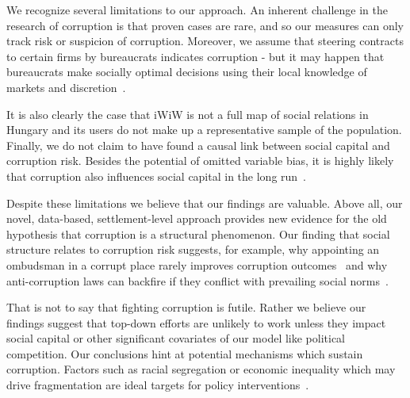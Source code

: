 We recognize several limitations to our approach. An inherent challenge in the research of corruption is that proven cases are rare, and so our measures can only track risk or suspicion of corruption. Moreover, we assume that steering contracts to certain firms by bureaucrats indicates corruption - but it may happen that bureaucrats make socially optimal decisions using their local knowledge of markets and discretion~\cite{coviello2017effect}.

It is also clearly the case that iWiW is not a full map of social relations in Hungary and its users do not make up a representative sample of the population. Finally, we do not claim to have found a causal link between social capital and corruption risk. Besides the potential of omitted variable bias, it is highly likely that corruption also influences social capital in the long run~\cite{richey2010impact}.

Despite these limitations we believe that our findings are valuable. Above all, our novel, data-based, settlement-level approach provides new evidence for the old hypothesis that corruption is a structural phenomenon. Our finding that social structure relates to corruption risk suggests, for example, why appointing an ombudsman in a corrupt place rarely improves corruption outcomes~\cite{mungiu2013controlling} and why anti-corruption laws can backfire if they conflict with prevailing social norms~\cite{acemoglu2017social}. 

That is not to say that fighting corruption is futile. Rather we believe our findings suggest that top-down efforts are unlikely to work unless they impact social capital or other significant covariates of our model like political competition. Our conclusions hint at potential mechanisms which sustain corruption. Factors such as racial segregation or economic inequality which may drive fragmentation are ideal targets for policy interventions~\cite{rothstein2005all}. 

